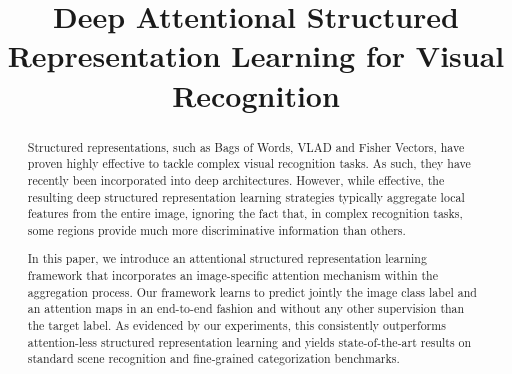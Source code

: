 \documentclass{bmvc2k}
\title{Deep Attentional Structured Representation Learning for Visual Recognition}
\newcommand{\comment}[1]{}
\newcommand{\comment}[1]{}
\begin{document}
	
\maketitle
\begin{abstract}
Structured representations, such as Bags of Words, VLAD and Fisher Vectors, have proven highly effective to tackle complex visual recognition tasks. As such, they have recently been incorporated into deep architectures. However, while effective, the resulting deep structured representation learning strategies typically aggregate local features from the entire image, ignoring the fact that, in complex recognition tasks, some regions provide much more discriminative information than others.

In this paper, we introduce an attentional structured representation learning framework that incorporates an image-specific attention mechanism within the aggregation process. Our framework learns to predict jointly the image class label and an attention maps in an end-to-end fashion and without any other supervision than the target label. As evidenced by our experiments, this consistently outperforms attention-less structured representation learning and yields state-of-the-art results on standard scene recognition and fine-grained categorization benchmarks.

\comment{
Structured representations has proven highly effective to aggregate the local image descriptors by computing higher order statistics. Recent Convolutional Neural Networks, particularly NetVLAD, has modeled these representations as a learnable pooling layers showing great improvements. However, the individual VLAD encoded deep  CNN local feature vectors are typically aggregated uniformly, thereby not exploiting the discriminative power of certain semantic regions specific to the target label. 

In this work, we propose to model a discriminative attention-aware structured representation encoding by incorporating an image-specific attention mechanism. Importantly, we pose learning attention as an auxiliary task requiring no additional annotation. We incorporate the new soft-attentional weight into the structured layer and jointly optimize the complete system in an end-to-end manner.  Experiments show by integrating  attention mechanism to NetVLAD achieves state-of-art results on MIT-Indoor Scene dataset and competitive performance on three fine-grained datasets.
}
\end{abstract}


\end{document}
